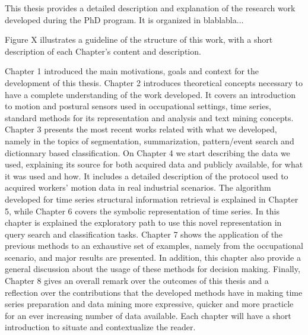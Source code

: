 This thesis provides a detailed description and explanation of the research work developed during the PhD program. It is organized in blablabla...


Figure X illustrates a guideline of the structure of this work, with a short description of each Chapter's content and description.

Chapter 1 introduced the main motivations, goals and context for the development of this thesis. Chapter 2 introduces theoretical concepts necessary to have a complete understanding of the work developed. It covers an introduction to motion and postural sensors used in occupational settings, time series, standard methods for its representation and analysis and text mining concepts. Chapter 3 presents the most recent works related with what we developed, namely in the topics of segmentation, summarization, pattern/event search and dictionnary based classification. On Chapter 4 we start describing the data we used, explaining its source for both acquired data and publicly available, for what it was used and how. It includes a detailed description of the protocol used to acquired workers' motion data in real industrial scenarios. The algorithm developed for time series structural information retrieval is explained in Chapter 5, while Chapter 6 covers the symbolic representation of time series. In this chapter is explained the exploratory path to use this novel representation in query search and classification tasks. Chapter 7 shows the application of the previous methods to an exhaustive set of examples, namely from the occupational scenario, and major results are presented. In addition, this chapter also provide a general discussion about the usage of these methods for decision making. Finally, Chapter 8 gives an overall remark over the outcomes of this thesis and a reflection over the contributions that the developed methods have in making time series preparation and data mining more expressive, quicker and more practicle for an ever increasing number of data available. Each chapter will have a short introduction to situate and contextualize the reader.
